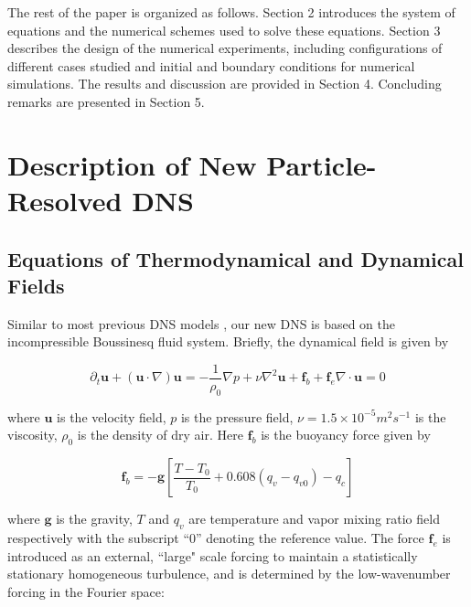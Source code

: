 \documentclass[draft,linenumbers]{agujournal}
\begin{document}
The rest of the paper is organized as follows. Section 2 introduces the system of equations and the numerical schemes used to solve these equations. Section 3 describes the design of the numerical experiments, including configurations of different cases studied and initial and boundary conditions for numerical simulations. The results and discussion are provided in Section 4. Concluding remarks are presented in Section 5. 

\section{Description of New Particle-Resolved DNS}\label{particle_dns}

\subsection{Equations of Thermodynamical and Dynamical Fields}

Similar to most previous DNS models \citep[e.g.,][]{And04}, our new DNS is based on the incompressible Boussinesq fluid system. Briefly, the dynamical field is given by

\begin{subequations}

\begin{equation}
\partial_{t}\mathbf{u}+(\mathbf{u}\cdot\nabla)\mathbf{u}=-\frac{1}{\rho_{0}}\nabla p+\nu\nabla^2 \mathbf{u}+\mathbf{f}_b + \mathbf{f}_e\label{eq:NS1}
\end{equation}


\begin{equation}
\nabla\cdot \mathbf{u}=0\label{eq:NS2}
\end{equation}

\end{subequations}

where $\mathbf{u}$ is the velocity field, $p$ is the pressure field, $\nu = 1.5\times 10^{-5}m^2s^{-1}$ is the  viscosity, $\rho_{0}$ is the density of dry air. Here $\mathbf{f}_b$ is the buoyancy force given by 

\begin{equation}
\mathbf{f}_b= 
-\mathbf{g}[\frac{T-T_{0}}{T_0}+0.608(q_{v}-q_{v0})-q_{c}]
\label{eq:source_term}
\end{equation}

where $\mathbf{g}$ is the gravity, $T$ and $q_{v}$ are temperature
and vapor mixing ratio field respectively with the subscript ``$0$''
denoting the reference value. The force $\mathbf{f}_e$ is introduced as an external, ``large" scale forcing to maintain a statistically stationary homogeneous turbulence, and is determined by the low-wavenumber forcing in the Fourier space:
\end{document}
